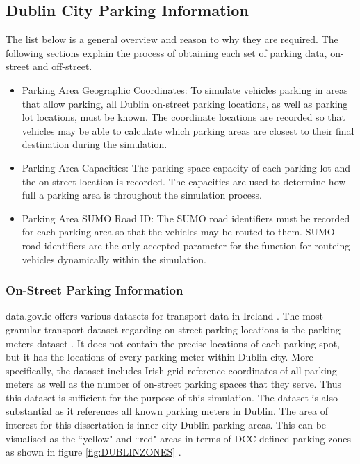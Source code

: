 
\subsection{Dublin City Parking Information}
The list below is a general overview and reason to why they are required. The following sections explain the process of obtaining each set of parking data, on-street and off-street.

\begin{itemize}
    \item Parking Area Geographic Coordinates: To simulate vehicles parking in areas that allow parking, all Dublin on-street parking locations, as well as parking lot locations, must be known. The coordinate locations are recorded so that vehicles may be able to calculate which parking areas are closest to their final destination during the simulation.
    \item Parking Area Capacities: The parking space capacity of each parking lot and the on-street location is recorded. The capacities are used to determine how full a parking area is throughout the simulation process.
    \item Parking Area SUMO Road ID: The SUMO road identifiers must be recorded for each parking area so that the vehicles may be routed to them. SUMO road identifiers are the only accepted parameter for the function for routeing vehicles dynamically within the simulation.
\end{itemize}

\subsubsection{On-Street Parking Information}\label{ssec:on-street_parking_info}
data.gov.ie offers various datasets for transport data in Ireland \citep{2017Data.gov.iePortal}. The most granular transport dataset regarding on-street parking locations is the parking meters dataset \citep{2017ParkingDataset}. It does not contain the precise locations of each parking spot, but it has the locations of every parking meter within Dublin city. More specifically, the dataset includes Irish grid reference coordinates of all parking meters as well as the number of on-street parking spaces that they serve. Thus this dataset is sufficient for the purpose of this simulation. The dataset is also substantial as it references all known parking meters in Dublin. The area of interest for this dissertation is inner city Dublin parking areas. This can be visualised as the ``yellow" and ``red" areas in terms of \ac{DCC} defined parking zones as shown in figure \ref{fig:DUBLINZONES} \citep{2017DublinTariffs}. 

